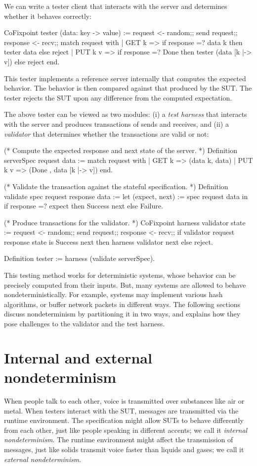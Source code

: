 We can write a tester client that interacts with the server and determines
whether it behaves correctly:
\begin{coq}
  CoFixpoint tester (data: key -> value) :=
    request <- random;;
    send request;;
    response <- recv;;
    match request with
    | GET k   => if response =? data k
                 then tester data
                 else reject
    | PUT k v => if response =? Done
                 then tester (data [k |-> v])
                 else reject
    end.
\end{coq}
This tester implements a reference server internally that computes the expected
behavior.  The behavior is then compared against that produced by the SUT.  The
tester rejects the SUT upon any difference from the computed expectation.

The above tester can be viewed as two modules: (i) a {\em test harness} that
interacts with the server and produces transactions of sends and receives, and
(ii) a {\em validator} that determines whether the transactions are valid or
not:
\begin{coq}
  (* Compute the expected response and next state of the server. *)
  Definition serverSpec request data :=
    match request with
    | GET k   => (data k, data)
    | PUT k v => (Done  , data [k |-> v])
    end.

  (* Validate the transaction against the stateful specification. *)
  Definition validate spec request response data :=
    let (expect, next) := spec request data in
    if response =? expect then Success next else Failure.

  (* Produce transactions for the validator. *)
  CoFixpoint harness validator state :=
    request <- random;;
    send request;;
    response <- recv;;
    if validator request response state is Success next
    then harness validator next
    else reject.

  Definition tester := harness (validate serverSpec).
\end{coq}
This testing method works for deterministic systems, whose behavior can be
precisely computed from their inputs.  But, many systems are allowed to behave
nondeterministically.  For example, systems may implement various hash
algorithms, or buffer network packets in different ways.  The following sections
discuss nondeterminism by partitioning it in two ways, and explains how they
pose challenges to the validator and the test harness.

\section{Internal and external nondeterminism}
\label{sec:internal-external-nondeterminism}
When people talk to each other, voice is transmitted over substances like air or
metal.  When testers interact with the SUT, messages are transmitted via the
runtime environment.  The specification might allow SUTs to behave differently
from each other, just like people speaking in different accents; we call it {\em
internal nondeterminism}.  The runtime environment might affect the transmission
of messages, just like solids transmit voice faster than liquids and gases; we
call it {\em external nondeterminism}.

